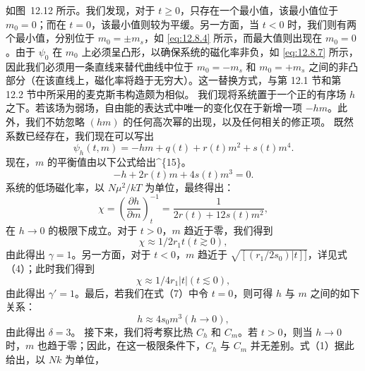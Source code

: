 如图~12.12 所示。我们发现，对于 \(t \geq 0\)，只存在一个最小值，该最小值位于 \(m_0 = 0\)；而在 \(t = 0\)，该最小值则较为平缓。另一方面，当 \(t < 0\) 时，我们则有两个最小值，分别位于 \(m_0 = \pm m_s\)，如 \autoref{eq:12.8.4} 所示，而最大值则出现在 \(m_0 = 0\)。由于 \(\psi_{0}\) 在 \(m_0\) 上必须呈凸形，以确保系统的磁化率非负，如 \autoref{eq:12.8.7} 所示，因此我们必须用一条直线来替代曲线中位于 \(m_0 = -m_s\) 和 \(m_0 = +m_s\) 之间的非凸部分（在该直线上，磁化率将趋于无穷大）。这一替换方式，与第 12.1 节和第 12.2 节中所采用的麦克斯韦构造颇为相似。
我们现将系统置于一个正的有序场 \(h\) 之下。若该场为弱场，自由能的表达式中唯一的变化仅在于新增一项 \(-hm\)。此外，我们不妨忽略 \((hm)\) 的任何高次幂的出现，以及任何相关的修正项。
既然系数已经存在，我们现在可以写出
\begin{equation}\tag{12.9.6}\label{eq:12.9.6}
\psi _ { h } ( t , m ) = - h m + q ( t ) + r ( t ) m ^{2} + s ( t ) m ^{4} .
\end{equation}
现在，\(m\) 的平衡值由以下公式给出\^{}\{15\}。
\begin{equation}\tag{12.9.7}\label{eq:12.9.7}
- h + 2 r ( t ) m + 4 s ( t ) m ^{3} = 0 .
\end{equation}
系统的低场磁化率，以 \(N\mu^{2}/kT\) 为单位，最终得出：
\begin{equation}\tag{12.9.8}\label{eq:12.9.8}
\chi = \left( \frac { \partial h } { \partial m } \right) _ { t } ^{- 1} = \frac { 1 } { 2 r ( t ) + 12 s ( t ) m ^{2} } ,
\end{equation}
在 \(h \to 0\) 的极限下成立。对于 \(t > 0\)，\(m\) 趋近于零，我们得到
\begin{equation}\tag{12.9.9}\label{eq:12.9.9}
\chi \approx 1 / 2 r _ { 1 } t  ( t \gtrsim 0 ) ,
\end{equation}
由此得出 \(\gamma=1\)。另一方面，对于 \(t<0\)，\(m\) 趋近于 \(\sqrt{[(r_1/2s_0)|t]]}\)，详见式（4）；此时我们得到
\begin{equation}\tag{12.9.10}\label{eq:12.9.10}
\chi \approx 1 / 4 r _ { 1 } | t |  ( t \lesssim 0 ) ,
\end{equation}
由此得出 \(\gamma'=1\)。最后，若我们在式（7）中令 \(t=0\)，则可得 \(h\) 与 \(m\) 之间的如下关系：
\begin{equation}\tag{12.9.11}\label{eq:12.9.11}
h \approx 4 s _ { 0 } m ^{3}  ( h \rightarrow 0 ) ,
\end{equation}
由此得出 \(\delta = 3\)。
接下来，我们将考察比热 \(C_{h}\) 和 \(C_{m}\)。若 \(t > 0\)，则当 \(h \to 0\) 时，\(m\) 也趋于零；因此，在这一极限条件下，\(C_{h}\) 与 \(C_{m}\) 并无差别。式（1）据此给出，以 \(Nk\) 为单位，
